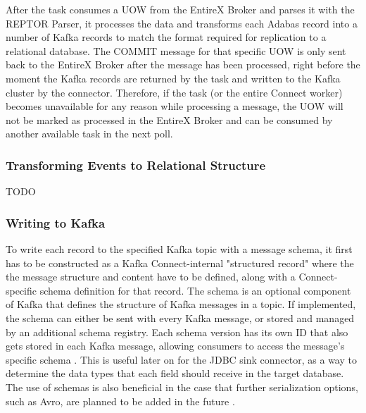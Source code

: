 After the task consumes a \ac{UOW} from the EntireX Broker and parses it with the \ac{REPTOR} Parser, it processes the data and transforms each Adabas record into a number of Kafka records to match the format required for replication to a relational database. The COMMIT message for that specific \ac{UOW} is only sent back to the EntireX Broker after the message has been processed, right before the moment the Kafka records are returned by the task and written to the Kafka cluster by the connector. Therefore, if the task (or the entire Connect worker) becomes unavailable for any reason while processing a message, the \ac{UOW} will not be marked as processed in the EntireX Broker and can be consumed by another available task in the next poll.

\subsubsection{Transforming Events to Relational Structure}
\label{ch04:pipelinedevelopment:implementation:transformingtorelational}
TODO

\subsubsection{Writing to Kafka} 
To write each record to the specified Kafka topic with a message schema, it first has to be constructed as a Kafka Connect-internal "structured record" where the the message structure and content have to be defined, along with a Connect-specific schema definition for that record. The schema is an optional component of Kafka that defines the structure of Kafka messages in a topic. If implemented, the schema can either be sent with every Kafka message, or stored and managed by an additional schema registry. Each schema version has its own ID that also gets stored in each Kafka message, allowing consumers to access the message's specific schema \cite{kafkadatabaseinverted}. This is useful later on for the \ac{JDBC} sink connector, as a way to determine the data types that each field should receive in the target database. The use of schemas is also beneficial in the case that further serialization options, such as Avro, are planned to be added in the future \cite{kreps2011kafka}.

